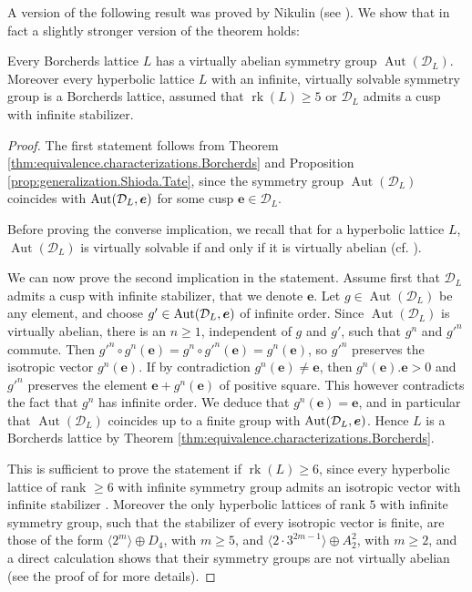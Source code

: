 \documentclass[11pt,letterpaper]{amsart}
\newcommand{\vect}[1]{\boldsymbol{#1}}
\DeclareMathOperator{\rk}{rk}
\DeclareMathOperator{\Aut}{Aut}
\begin{document}
A version of the following result was proved by Nikulin (see \cite[Theorem~9.1.1~and~its~preceding~discussion]{nikulin.factor.groups}). We show that in fact a slightly stronger version of the theorem holds:

\begin{theorem}\label{thm:virtually.abelian} 
Every Borcherds lattice $L$ has a virtually abelian symmetry group $\Aut(\mathcal{D}_L)$. Moreover every hyperbolic lattice $L$ with an infinite, virtually solvable symmetry group is a Borcherds lattice, assumed that $\rk(L)\ge 5$ or $\mathcal{D}_L$ admits a cusp with infinite stabilizer. 
\end{theorem}
\begin{proof}
The first statement follows from Theorem \ref{thm:equivalence.characterizations.Borcherds} and Proposition \ref{prop:generalization.Shioda.Tate}, since the symmetry group $\Aut(\mathcal{D}_L)$ coincides with $\Stabe$ for some cusp $\vect{e}\in \mathcal{D}_L$.

Before proving the converse implication, we recall that for a hyperbolic lattice $L$, $\Aut(\mathcal{D}_L)$ is virtually solvable if and only if it is virtually abelian (cf. \cite[Theorems~5.5.9,~5.5.10]{ratcliffe}).

We can now prove the second implication in the statement. Assume first that $\mathcal{D}_L$ admits a cusp with infinite stabilizer, that we denote $\vect{e}$.
Let $g\in \Aut(\mathcal{D}_L)$ be any element, and choose $g'\in \Stabe$ of infinite order. Since $\Aut(\mathcal{D}_L)$ is virtually abelian, there is an $n\ge 1$, independent of $g$ and $g'$, such that $g^n$ and $g'^n$ commute. Then $g'^n\circ g^n(\vect{e})=g^n \circ g'^n(\vect{e})=g^n(\vect{e})$, so $g'^n$ preserves the isotropic vector $g^n(\vect{e})$. If by contradiction $g^n(\vect{e})\ne \vect{e}$, then $g^n(\vect{e}).\vect{e}>0$ and $g'^n$ preserves the element $\vect{e}+g^n(\vect{e})$ of positive square. This however contradicts the fact that $g^n$ has infinite order.
We deduce that $g^n(\vect{e})=\vect{e}$, and in particular that $\Aut(\mathcal{D}_L)$ coincides up to a finite group with $\Stabe$. Hence $L$ is a Borcherds lattice by Theorem \ref{thm:equivalence.characterizations.Borcherds}.

This is sufficient to prove the statement if $\rk(L)\ge 6$, since every hyperbolic lattice of rank $\ge 6$ with infinite symmetry group admits an isotropic vector with infinite stabilizer \cite[Theorem~6.4.1]{nikulin.factor.groups}. Moreover the only hyperbolic lattices of rank $5$ with infinite symmetry group, such that the stabilizer of every isotropic vector is finite, are those of the form $\langle 2^m\rangle \oplus D_4$, with $m\ge 5$, and $\langle 2\cdot 3^{2m-1}\rangle \oplus A_2^2$, with $m\ge 2$, and a direct calculation shows that their symmetry groups are not virtually abelian (see the proof of \cite[Theorem~9.1.1]{nikulin.factor.groups} for more details).
\end{proof}
\end{document}
